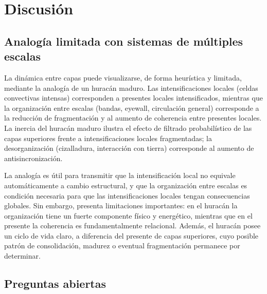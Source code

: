 \section{Discusión}

\subsection{Analogía limitada con sistemas de múltiples escalas}

La dinámica entre capas puede visualizarse, de forma heurística y limitada, mediante la analogía de un huracán maduro. Las intensificaciones locales (celdas convectivas intensas) corresponden a presentes locales intensificados, mientras que la organización entre escalas (bandas, eyewall, circulación general) corresponde a la reducción de fragmentación y al aumento de coherencia entre presentes locales. La inercia del huracán maduro ilustra el efecto de filtrado probabilístico de las capas superiores frente a intensificaciones locales fragmentadas; la desorganización (cizalladura, interacción con tierra) corresponde al aumento de antisincronización.

La analogía es útil para transmitir que la intensificación local no equivale automáticamente a cambio estructural, y que la organización entre escalas es condición necesaria para que las intensificaciones locales tengan consecuencias globales. Sin embargo, presenta limitaciones importantes: en el huracán la organización tiene un fuerte componente físico y energético, mientras que en el presente la coherencia es fundamentalmente relacional. Además, el huracán posee un ciclo de vida claro, a diferencia del presente de capas superiores, cuyo posible patrón de consolidación, madurez o eventual fragmentación permanece por determinar.

\subsection{Preguntas abiertas}

